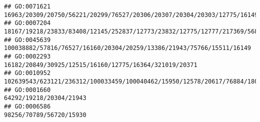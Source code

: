 \documentclass[
]{article}
\begin{document}
\begin{verbatim}
## GO:0071621                                                                                                                                                                                                                                                                                                                                      16963/20309/20750/56221/20299/76527/20306/20307/20304/20303/12775/16149
## GO:0007204                                                                                                                                                                                                                                                                                                                  18167/19218/23833/83408/12145/252837/12773/23832/12775/12777/217369/56838/12458/14293/12766
## GO:0045639                                                                                                                                                                                                                                                                                                                                        100038882/57816/76527/16160/20304/20259/13386/21943/75766/15511/16149
## GO:0002293                                                                                                                                                                                                                                                                                                                                                       16182/20849/30925/12515/16160/12775/16364/321019/20371
## GO:0010952                                                                                                                                                                                                                                                                                                                  102639543/623121/236312/100033459/100040462/15950/12578/20617/76884/18053/18095/54483/19876
## GO:0001660                                                                                                                                                                                                                                                                                                                                                                                      64292/19218/20304/21943
## GO:0006586                                                                                                                                                                                                                                                                                                                                                                                      98256/70789/56720/15930

\end{verbatim}
\end{document}
